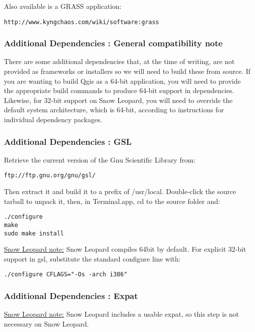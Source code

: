 Also available is a GRASS application:

\begin{verbatim}
http://www.kyngchaos.com/wiki/software:grass
\end{verbatim}

\subsubsection{Additional Dependencies : General compatibility note}
There are some additional dependencies that, at the time of writing, are not
provided as frameworks or installers so we will need to build these from source.
If you are wanting to build Qgis as a 64-bit application, you will need to 
provide the appropriate build commands to produce 64-bit support in dependencies.
Likewise, for 32-bit support on Snow Leopard, you will need to override the
default system architecture, which is 64-bit, according to instructions for
individual dependency packages.

\subsubsection{Additional Dependencies : GSL}
Retrieve the current version of the Gnu Scientific Library from:

\begin{verbatim}
ftp://ftp.gnu.org/gnu/gsl/
\end{verbatim}

Then extract it and build it to a prefix of /usr/local.  Double-click the source
tarball to unpack it, then, in Terminal.app, cd to the source folder and:

\begin{verbatim}
./configure
make
sudo make install
\end{verbatim}

\underline{Snow Leopard note:} Snow Leopard compiles 64bit by default.
For explicit 32-bit support in gsl, substitute the standard configure line with:

\begin{verbatim}
./configure CFLAGS="-Os -arch i386"
\end{verbatim}

\subsubsection{Additional Dependencies : Expat}
\underline{Snow Leopard note:} Snow Leopard includes a usable expat, so this step is 
not necessary on Snow Leopard.

